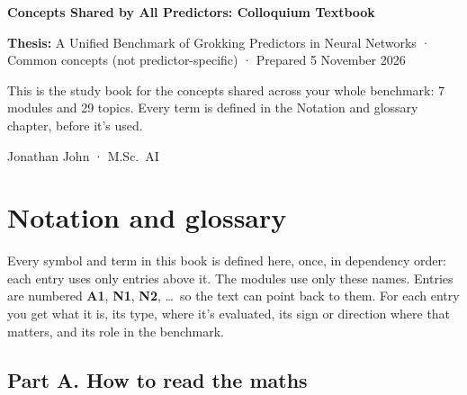\documentclass[11pt,a4paper,oneside,openany]{report}
\newcommand{\gl}[1]{\textbf{#1}}   %
\begin{document}
\begin{titlepage}
\raggedright
{\LARGE\bfseries Concepts Shared by All Predictors: Colloquium Textbook\par}
\vspace{6pt}
\textbf{Thesis:} A Unified Benchmark of Grokking Predictors in Neural Networks · Common concepts (not predictor-specific) · Prepared 5 November 2026
\vspace{14pt}

This is the study book for the concepts shared across your whole benchmark: 7 modules and 29 topics. Every term is defined in the Notation and glossary chapter, before it's used.

\vspace{10pt}
Jonathan John · M.Sc.\ AI

\end{titlepage}

\tableofcontents
\clearpage
\chapter*{Notation and glossary}

Every symbol and term in this book is defined here, once, in dependency order: each entry uses only entries above it. The modules use only these names. Entries are numbered \gl{A1}, \gl{N1}, \gl{N2}, \ldots\ so the text can point back to them. For each entry you get what it is, its type, where it's evaluated, its sign or direction where that matters, and its role in the benchmark.

\section*{Part A. How to read the maths}
\end{document}
